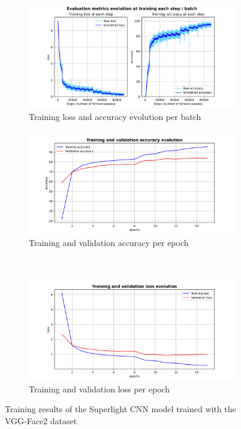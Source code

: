 \documentclass[11pt, a4paper]{article}
\numberwithin{equation}{subsection}
\begin{document}
\begin{figure}[h!]
  \centering
  \begin{subfigure}[b]{0.45\textwidth}
    \includegraphics[width=\textwidth]{images/v4_loss_acc_per_batch.png}
    \caption{Training loss and accuracy evolution per batch}
    \label{fig:image1}
  \end{subfigure}
  \hspace{0\textwidth} %
  \begin{subfigure}[b]{0.45\textwidth}
    \includegraphics[width=\textwidth]{images/v4_train_validation_accuracy.png}
    \caption{Training and validation accuracy per epoch}
    \label{fig:image2}
  \end{subfigure}\\[0.5ex] %
  \begin{subfigure}[b]{0.45\textwidth}
    \includegraphics[width=\textwidth]{images/v4_train_validation_loss.png}
    \caption{Training and validation loss per epoch}
    \label{fig:image3}
  \end{subfigure}
  \caption{Training results of the Superlight CNN model trained with the VGG-Face2 dataset}
  \label{fig:three_images_1}
\end{figure}
\end{document}

